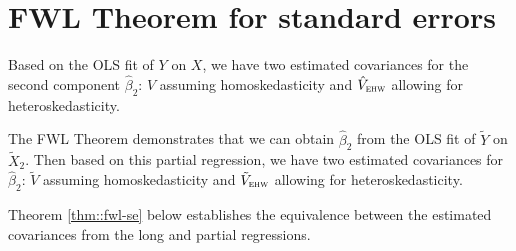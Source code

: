 %
%
%



\section{FWL Theorem for standard errors}

Based on the OLS fit of $Y$ on $X$, we have two estimated covariances for the second component $ \hat{\beta}_2$: $\hat{V}$ assuming homoskedasticity and $\hat{V}_{\textsc{ehw}}$
allowing for heteroskedasticity.

The FWL Theorem demonstrates that we can obtain $ \hat{\beta}_2$ from the OLS fit of $\tilde{Y}$ on $\tilde{X}_2$. Then based on this partial regression, we have two estimated covariances for $ \hat{\beta}_2$: 
$
\tilde{V}  
$ 
assuming homoskedasticity and 
$
\tilde{V}_{\textsc{ehw}}  
$
 allowing for heteroskedasticity. 
 
Theorem \ref{thm::fwl-se} below establishes the equivalence between the estimated covariances from the long and partial regressions.
  
